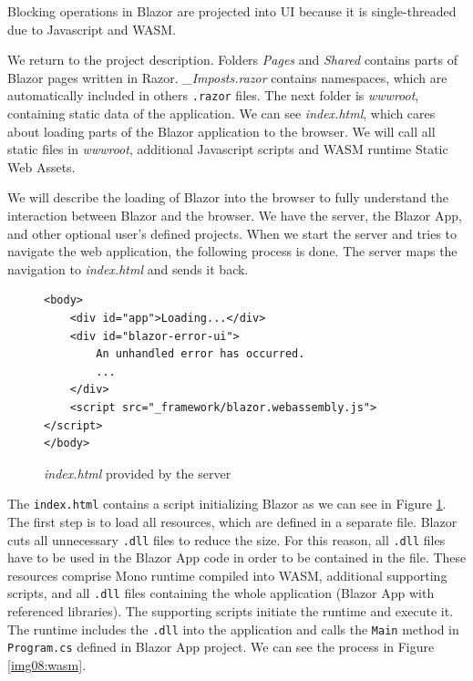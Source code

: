 Blocking operations in Blazor are projected into UI because it is single-threaded due to Javascript and WASM.
\par
We return to the project description. 
Folders \textit{Pages} and \textit{Shared} contains parts of Blazor pages written in Razor.
\textit{\_Imposts.razor} contains namespaces, which are automatically included in others \texttt{.razor} files.
The next folder is \textit{wwwroot}, containing static data of the application.
We can see \textit{index.html}, which cares about loading parts of the Blazor application to the browser.
We will call all static files in \textit{wwwroot}, additional Javascript scripts and WASM runtime Static Web Assets.
\par
We will describe the loading of Blazor into the browser to fully understand the interaction between Blazor and the browser.
We have the server, the Blazor App, and other optional user's defined projects. 
When we start the server and tries to navigate the web application, the following process is done.
The server maps the navigation to \textit{index.html} and sends it back.
\par
\begin{figure}[b!]
\begin{lstlisting}
<body>
    <div id="app">Loading...</div>
    <div id="blazor-error-ui">
        An unhandled error has occurred.
		...
    </div>
    <script src="_framework/blazor.webassembly.js"></script>
</body>

\end{lstlisting}
\caption{\textit{index.html} provided by the server}
\label{img07:index}
\end{figure}
\par 
The \texttt{index.html} contains a script initializing Blazor as we can see in Figure \ref{img07:index}.
The first step is to load all resources, which are defined in a separate file.
Blazor cuts all unnecessary \texttt{.dll} files to reduce the size.
For this reason, all \texttt{.dll} files have to be used in the Blazor App code in order to be contained in the file. 
These resources comprise Mono runtime compiled into WASM, additional supporting scripts, and all \texttt{.dll} files containing the whole application (Blazor App with referenced libraries).
The supporting scripts initiate the runtime and execute it.
The runtime includes the \texttt{.dll} into the application and calls the \texttt{Main} method in \texttt{Program.cs} defined in Blazor App project.
We can see the process in Figure \ref{img08:wasm}.
\par
